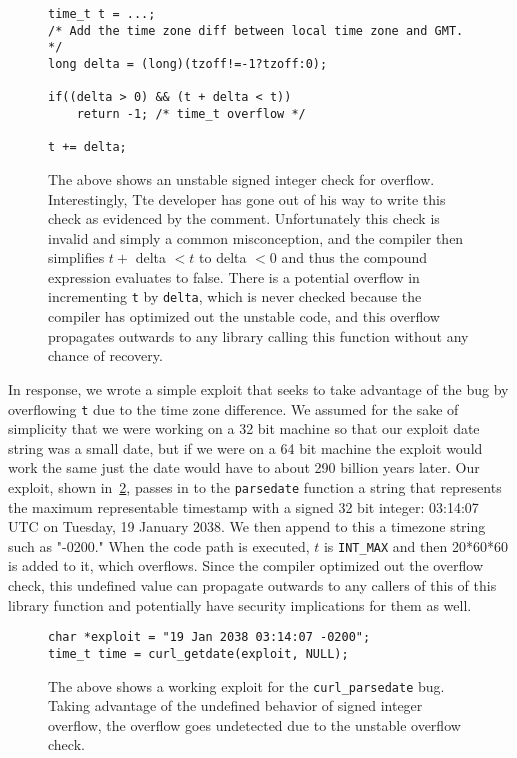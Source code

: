 \documentclass[9pt,twocolumn]{article}
\begin{document}
\begin{figure}[h]
\begin{lstlisting}
time_t t = ...;
/* Add the time zone diff between local time zone and GMT. */
long delta = (long)(tzoff!=-1?tzoff:0);
 
if((delta > 0) && (t + delta < t))
    return -1; /* time_t overflow */
 
t += delta;
\end{lstlisting}
\label{fig:libcurl1}
\caption{The above shows an unstable signed integer check for overflow. Interestingly, Tte developer has gone out of his way to write this check as evidenced  by the comment. Unfortunately this check is invalid and simply a common misconception, and the compiler then simplifies $ t  + $ delta $ < t$ to delta $ < 0$ and thus the compound expression evaluates to false. There is a potential overflow in incrementing \texttt{t} by \texttt{delta}, which is never checked because the compiler has optimized out the unstable code, and this overflow propagates outwards to any library calling this function without any chance of recovery.}
\end{figure}


In response, we wrote a simple exploit that seeks to take advantage of the bug by overflowing \texttt{t} due to the time zone difference. We assumed for the sake of simplicity that we were working on a 32 bit machine so that our exploit date string was a small date, but if we were on a 64 bit machine the exploit would work the same just the date would have to about 290 billion years later. Our exploit, shown in~\ref{fig:curl-xploit}, passes in to the \texttt{parsedate} function a string that represents the maximum representable timestamp with a signed 32 bit integer: 03:14:07 UTC on Tuesday, 19 January 2038. We then append to this a timezone string such as "-0200." When the code path is executed, $t$ is \texttt{INT\_MAX} and then 20*60*60 is added to it, which overflows. Since the compiler optimized out the overflow check, this undefined value can propagate outwards to any callers of this of this library function and potentially have security implications for them as well.

\begin{figure}[h]
\begin{lstlisting}
char *exploit = "19 Jan 2038 03:14:07 -0200";
time_t time = curl_getdate(exploit, NULL);
\end{lstlisting}
\label{fig:curl-xploit}
\caption{The above shows a working exploit for the \texttt{curl\_parsedate} bug. Taking advantage of the undefined behavior of signed integer overflow, the overflow goes undetected due to the unstable overflow check. }
\end{figure}
\end{document}
